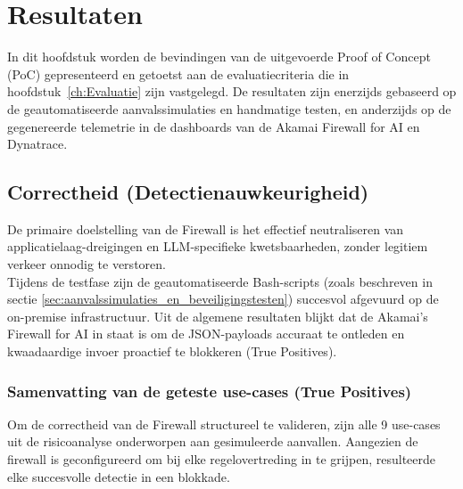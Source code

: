 \chapter{Resultaten}
\label{ch:resultaten}

In dit hoofdstuk worden de bevindingen van de uitgevoerde Proof of Concept (PoC) gepresenteerd en getoetst aan de evaluatiecriteria die in hoofdstuk~\ref{ch:Evaluatie} zijn vastgelegd. De resultaten zijn enerzijds gebaseerd op de geautomatiseerde aanvalssimulaties en handmatige testen, en anderzijds op de gegenereerde telemetrie in de dashboards van de Akamai Firewall for AI en Dynatrace.

\section{Correctheid (Detectienauwkeurigheid)}

De primaire doelstelling van de Firewall is het effectief neutraliseren van applicatielaag-dreigingen en LLM-specifieke kwetsbaarheden, zonder legitiem verkeer onnodig te verstoren.\\

Tijdens de testfase zijn de geautomatiseerde Bash-scripts (zoals beschreven in sectie \ref{sec:aanvalssimulaties_en_beveiligingstesten}) succesvol afgevuurd op de on-premise infrastructuur. Uit de algemene resultaten blijkt dat de Akamai's Firewall for AI in staat is om de JSON-payloads accuraat te ontleden en kwaadaardige invoer proactief te blokkeren (True Positives).

\subsection{Samenvatting van de geteste use-cases (True Positives)}

Om de correctheid van de Firewall structureel te valideren, zijn alle 9 use-cases uit de risicoanalyse onderworpen aan gesimuleerde aanvallen. Aangezien de firewall is geconfigureerd om bij elke regelovertreding in te grijpen, resulteerde elke succesvolle detectie in een blokkade.

